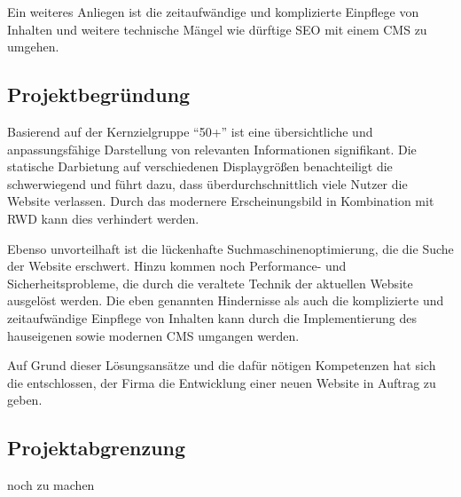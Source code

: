 Ein weiteres Anliegen ist die zeitaufwändige und komplizierte Einpflege von
Inhalten und weitere technische Mängel wie \zB dürftige \ac{SEO} mit einem
\ac{CMS} zu umgehen.


\subsection{Projektbegründung} 
\label{sec:Projektbegruendung}
Basierend auf der Kernzielgruppe "`50+"' ist eine übersichtliche und
anpassungsfähige Darstellung von relevanten Informationen signifikant. 
Die statische Darbietung auf verschiedenen Displaygrößen benachteiligt die
 schwerwiegend und führt dazu, dass
überdurchschnittlich viele Nutzer die Website verlassen. Durch das modernere
Erscheinungsbild in Kombination mit \ac{RWD} kann dies verhindert werden.
 
Ebenso unvorteilhaft ist die lückenhafte Suchmaschinenoptimierung, die die Suche
der Website erschwert. Hinzu kommen noch Performance- und
Sicherheitsprobleme, die durch die veraltete Technik der aktuellen Website
ausgelöst werden. Die eben genannten Hindernisse als auch die komplizierte und
zeitaufwändige Einpflege von Inhalten kann durch die Implementierung des
hauseigenen sowie modernen \ac{CMS} \ct umgangen werden.

Auf Grund dieser Lösungsansätze und die dafür nötigen Kompetenzen hat sich die
\kunde entschlossen, der Firma \mh die Entwicklung einer neuen Website in
Auftrag zu geben.

\subsection{Projektabgrenzung} 
\label{sec:Projektabgrenzung}

\xx noch zu machen
